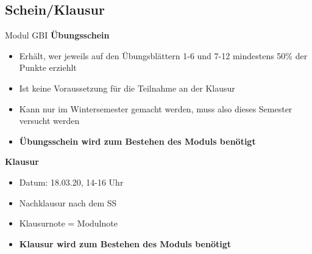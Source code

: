 \subsection{Schein/Klausur}
 \begin{frame}{Modul GBI}
		\textbf{Übungsschein}
			\begin{itemize}
				\item Erhält, wer jeweils auf den Übungsblättern 1-6 und 7-12 mindestens 50\% der Punkte erziehlt
				\item Ist keine Voraussetzung für die Teilnahme an der Klausur
				\item Kann nur im Wintersemester gemacht werden, muss also dieses Semester versucht werden
				\item \textbf{Übungsschein wird zum Bestehen des Moduls benötigt} 
			\end{itemize}
		\pause	
		\textbf{Klausur}
		\begin{itemize}
				\item Datum: 18.03.20, 14-16 Uhr
				\item Nachklausur nach dem SS
				\item Klausurnote = Modulnote
				\item \textbf{Klausur wird zum Bestehen des Moduls benötigt} 
			\end{itemize}
	\end{frame}
	
